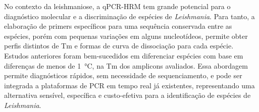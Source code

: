 No contexto da leishmaniose, a qPCR-HRM tem grande potencial
para o diagnóstico molecular e a discriminação de espécies de
\textit{Leishmania}. Para tanto, a elaboração de primers específicos para uma
sequência conservada entre as espécies, porém com pequenas variações em alguns
nucleotídeos, permite obter perfis distintos de Tm e
formas de curva de dissociação para cada espécie.
Estudos anteriores foram bem-sucedidos em diferenciar espécies com base em
diferenças de menos de \qty{1}{\celsius}, na Tm dos amplicons
avaliados\cite{Azam2024,HRMzampi2016,SaadiBenAoun2024}.
Essa abordagem permite diagnósticos rápidos, sem necessidade de sequenciamento,
e pode ser integrada a plataformas de PCR em tempo real já existentes,
representando uma alternativa sensível, específica e custo-efetiva para a
identificação de espécies de \textit{Leishmania}.
 
